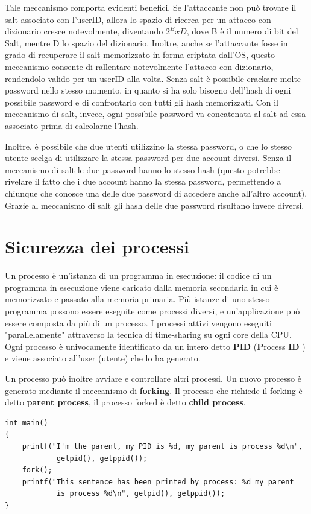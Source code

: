 Tale meccanismo comporta evidenti benefici. Se l’attaccante non può trovare il salt associato con l’userID, allora lo spazio di ricerca per un attacco con dizionario cresce notevolmente, diventando $2^{B} x D$, dove B è il numero di bit del Salt, mentre D lo spazio del dizionario. \newline
Inoltre, anche se l'attaccante fosse in grado di recuperare il salt memorizzato in forma criptata dall’OS, questo meccanismo consente di rallentare notevolmente l’attacco con dizionario, rendendolo valido per un userID alla volta. Senza salt è possibile crackare molte password nello stesso momento, in quanto si ha solo bisogno dell'hash di ogni possibile password e di confrontarlo con tutti gli hash memorizzati. Con il meccanismo di salt, invece, ogni possibile password va
concatenata al salt ad essa associato prima di calcolarne l'hash.\newline \newline

Inoltre, è possibile che due utenti utilizzino la stessa password, o che lo stesso utente scelga di utilizzare la stessa password per due account diversi. Senza il meccanismo di salt le due password hanno lo stesso hash (questo potrebbe rivelare il fatto che i due account hanno la stessa password, permettendo a chiunque che conosce una delle due password di accedere anche all’altro account). Grazie al meccanismo di salt gli hash delle due password risultano invece diversi.

\section{Sicurezza dei processi}
Un processo è un'istanza di un programma in esecuzione: il codice di un programma in esecuzione viene caricato dalla memoria secondaria in cui è memorizzato e passato alla memoria primaria. Più istanze di uno stesso programma possono essere eseguite come processi diversi, e un'applicazione può essere composta da più di un processo.  I processi attivi vengono eseguiti "parallelamente" attraverso la tecnica di time-sharing su ogni core della CPU. Ogni processo è univocamente identificato da un intero detto \textbf{PID} (\textbf{P}rocess \textbf{ID} ) e viene associato all'user (utente) che lo ha generato. \newline \newline

Un processo può inoltre avviare e controllare altri processi. Un nuovo processo è generato mediante il meccanismo di \textbf{forking}. Il processo che richiede il forking è detto \textbf{parent process}, il processo forked è detto \textbf{child process}.
\begin{algorithm}
\begin{lstlisting}[caption={Esempio forking in C}]
int main()
{
	printf("I'm the parent, my PID is %d, my parent is process %d\n", 
			getpid(), getppid());
	fork();
	printf("This sentence has been printed by process: %d my parent 
			is process %d\n", getpid(), getppid());
}
\end{lstlisting}
\end{algorithm}
